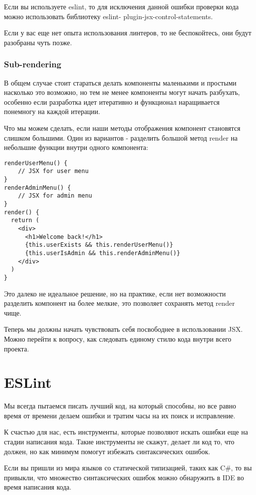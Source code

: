 Если вы используете eslint, то для исключения данной ошибки проверки кода можно использовать библиотеку eslint- plugin-jsx-control-statements.

Если у вас еще нет опыта использования линтеров, то не беспокойтесь, они будут разобраны чуть позже. 

\subsubsection*{Sub-rendering}

В общем случае стоит стараться делать компоненты маленькими и простыми насколько это возможно, но тем не менее компоненты могут начать разбухать, особенно если разработка идет итеративно и функционал наращивается понемногу на каждой итерации.

Что мы можем сделать, если наши методы отображения компонент становятся слишком большими. Один из вариантов - разделить большой метод render на небольшие функции внутри одного компонента:

\begin{lstlisting}
renderUserMenu() {
    // JSX for user menu
}
renderAdminMenu() {
    // JSX for admin menu
}
render() {
  return (
    <div>
      <h1>Welcome back!</h1>
      {this.userExists && this.renderUserMenu()}
      {this.userIsAdmin && this.renderAdminMenu()}
    </div> 
  )
}
\end{lstlisting}

Это далеко не идеальное решение, но на практике, если нет возможности разделить компонент на более мелкие, это позволяет сохранять метод render чище.

Теперь мы должны начать чувствовать себя посвободнее в использовании JSX. Можно перейти к вопросу, как следовать единому стилю кода внутри всего проекта.

\section{ESLint}

Мы всегда пытаемся писать лучший код, на который способны, но все равно время от времени делаем ошибки и тратим часы на их поиск и исправление.

К счастью для нас, есть инструменты, которые позволяют искать ошибки еще на стадии написания кода. Такие инструменты не скажут, делает ли код то, что должен, но как минимум помогут избежать синтаксических ошибок.

Если вы пришли из мира языков со статической типизацией, таких как C\#, то вы привыкли, что множество синтаксических ошибок можно обнаружить в IDE во время написания кода.

